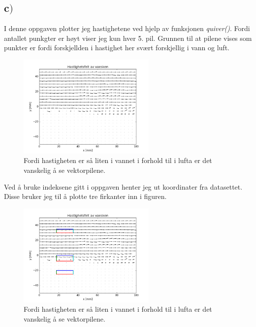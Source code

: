 \documentclass{article}
\begin{document}
\subsection*{c$)$}
I denne oppgaven plotter jeg hastighetene ved hjelp av funksjonen \textit{quiver()}. Fordi antallet punkgter er høyt viser jeg kun hver 5. pil. Grunnen til at pilene vises som punkter er fordi forskjellden i hastighet her svært forskjellig i vann og luft.
\begin{figure}[H]
\centering
\includegraphics[width=0.6\textwidth]{problem_c_1}
\caption{Fordi hastigheten er så liten i vannet i forhold til i lufta er det vanskelig å se vektorpilene.}
\label{fig:problem_b_vector_fig}
\end{figure}
Ved å bruke indeksene gitt i oppgaven henter jeg ut koordinater fra datasettet. Disse bruker jeg til å plotte tre firkanter inn i figuren.
\begin{figure}[H]
\centering
\includegraphics[width=0.6\textwidth]{problem_c_2}
\caption{Fordi hastigheten er så liten i vannet i forhold til i lufta er det vanskelig å se vektorpilene.}
\label{fig:problem_b_vector_fig}
\end{figure}
\end{document}
